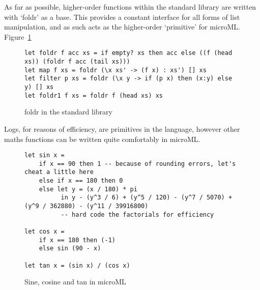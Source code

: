 As far as possible, higher-order functions within the standard library are written with `foldr' as a
base. This provides a constant interface for all forms of list manipulation, and as such acts as the
higher-order `primitive' for microML\@. Figure~\ref{fig:foldr}

\begin{figure}[H]
    \begin{verbatim}
let foldr f acc xs = if empty? xs then acc else ((f (head xs)) (foldr f acc (tail xs)))
let map f xs = foldr (\x xs' -> (f x) : xs') [] xs
let filter p xs = foldr (\x y -> if (p x) then (x:y) else y) [] xs
let foldr1 f xs = foldr f (head xs) xs
    \end{verbatim}
    \caption{foldr in the standard library}
\label{fig:foldr}
\end{figure}

Logs, for reasons of efficiency, are primitives in the language, however other maths functions can
be written quite comfortably in microML.

\begin{figure}
    \begin{verbatim}
let sin x = 
    if x == 90 then 1 -- because of rounding errors, let's cheat a little here
    else if x == 180 then 0
    else let y = (x / 180) * pi 
          in y - (y^3 / 6) + (y^5 / 120) - (y^7 / 5070) + (y^9 / 362880) - (y^11 / 39916800) 
          -- hard code the factorials for efficiency

let cos x = 
    if x == 180 then (-1)
    else sin (90 - x)

let tan x = (sin x) / (cos x)
    \end{verbatim}
    \caption{Sine, cosine and tan in microML}
\label{fig:maths}
\end{figure}
